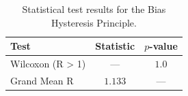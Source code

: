 \begin{table}[t]
\centering
\caption{Statistical test results for the Bias Hysteresis Principle.}
\label{tab:statistics}
\begin{tabular}{lcc}
\toprule
Test & Statistic & $p$-value \\
\midrule
  Wilcoxon (R > 1) & — & $1.0$ \\
  Grand Mean R & $1.133$ & — \\
\bottomrule
\end{tabular}
\end{table}